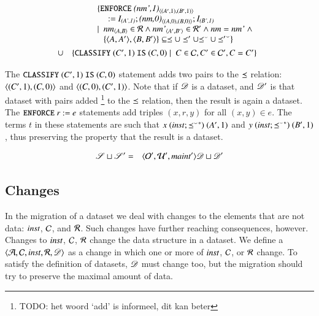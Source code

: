 \documentclass{elsarticle}
\begin{document}
\begin{definition}
   \begin{eqnarray}
      &&\begin{array}[t]{@{}l}
         \{ {\tt ENFORCE\ }\declare{(nm',1)}{(A',1)}{(B',1)}\\\quad{\tt\ :=\ }\ident{(A',1)};\declare{(nm,0)}{(A,0)}{(B,0)};\ident{(B',1)}\\
            \mid\ \begin{array}[t]{@{}l}
               \declare{nm}{A}{B}\in\rels\wedge\declare{nm'}{A'}{B'}\in\rels'\wedge\id{nm}=\id{nm'}\ \wedge\\
               \{\pair{A}{A'},\pair{B}{B'}\}\subseteq\isa\cup\isa'\cup\flip{\isa}\cup\flip{\isa'}\}
               \end{array}
           \end{array}\\
           &\cup&\begin{array}[t]{@{}l}
            \{ {\tt CLASSIFY\ }(C',1){\tt\ IS\ }(C,0)\mid\ C\in\concepts,C'\in\concepts',C=C'\}\\
           \end{array}
   \end{eqnarray}
\end{definition}

The ${\tt CLASSIFY\ }(C',1){\tt\ IS\ }(C,0)$ statement adds two pairs to the $\preceq$ relation:
$\langle{(C',1)},{(C,0)}\rangle$ and $\langle{(C,0)},{(C',1)}\rangle$.
Note that if $\mathscr{D}$ is a dataset, and $\mathscr{D}'$ is that dataset with pairs added%
\footnote{TODO: het woord `add' is informeel, dit kan beter} to the $\preceq$ relation, then the result is again a dataset.
The ${\tt ENFORCE\ }r{\tt\ :=\ }e$ statements add triples $(x,r,y)$ for all $(x,y)\in e$.
The terms $t$ in these statements are such that $x\ (\mathbin{\text{\it inst\/}} ; {{\preceq}^\smallsmile}^*)\ (A',1)$ and $y \ (\inst \compose \kleenestar{\flip{\isa}})\ (B',1)$, thus preserving the property that the result is a dataset.

\begin{definition}[]
   \begin{eqnarray}
      \mathscr{S}\sqcup\mathscr{S}'&=&\langle{\mathcal{O}'},{\mathcal{U}'},{\mathbin{\text{\it maint\/}}'}\rangle{\mathscr{D}\sqcup\mathscr{D}'}
   \end{eqnarray}
\end{definition}

\subsection{Changes}
   In the migration of a dataset we deal with changes to the elements that are not data:
   $\mathbin{\text{\it inst\/}}$, $\mathcal{C}$, and $\mathcal{R}$.
   Such changes have further reaching consequences, however.
   Changes to $\mathbin{\text{\it inst\/}}$, $\mathcal{C}$, $\mathcal{R}$ change the data structure in a dataset.
   We define a  $\langle\mathcal{A},\mathcal{C},\mathbin{\text{\it inst\/}},\mathcal{R},\mathscr{D}\rangle$ as a change in which one or more of $\mathbin{\text{\it inst\/}}$, $\mathcal{C}$, or $\mathcal{R}$ change.
   To satisfy the definition of datasets, $\mathscr{D}$ must change too,
   but the migration should try to preserve the maximal amount of data.
\end{document}
